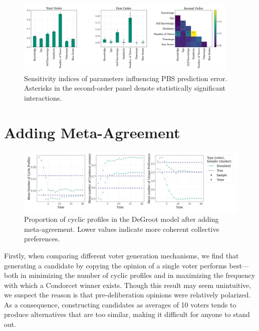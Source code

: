 \begin{figure}[ht]
	\begin{center}
		\includegraphics[width=0.95\textwidth]{Figures/senstivity_analysis.png}
	\end{center}
	\caption{Sensitivity indices of parameters influencing PBS prediction error. Asterisks in the second-order panel denote statistically significant interactions. }\label{fig:sensitivty_pbs}
\end{figure}


\section{Adding Meta-Agreement}

\begin{figure}[htbp]
	\centering
	\centering
	\includegraphics[width=\textwidth]{Figures/three_measures.png
	}
	\caption{Proportion of cyclic profiles in the DeGroot model after adding meta-agreement. Lower values indicate more coherent collective preferences.}
	\label{fig:degroot_cyclic}
\end{figure}

Firstly, when comparing different voter generation mechanisms, we find that generating a candidate by copying the opinion of a single voter performs best—both in minimizing the number of cyclic profiles and in maximizing the frequency with which a Condorcet winner exists. Though this result may seem unintuitive, we suspect the reason is that pre-deliberation opinions were relatively polarized. As a consequence, constructing candidates as averages of 10 voters tends to produce alternatives that are too similar, making it difficult for anyone to stand out.

